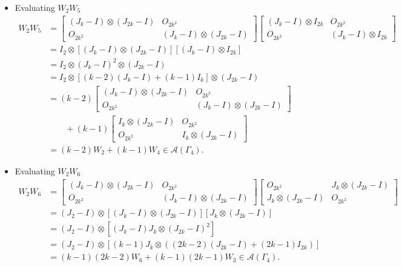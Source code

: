 \begin{itemize}
    \item Evaluating \( W_2 W_5 \)
    \begin{align*}
        W_2 W_5
        &=\begin{bmatrix}
            (J_k -I) \otimes (J_{2k} -I) & O_{2k^2}\\
            O_{2k^2} & (J_k -I) \otimes (J_{2k} -I)
        \end{bmatrix} \begin{bmatrix}
            (J_k -I) \otimes I_{2k} & O_{2k^2}\\
            O_{2k^2} & (J_k -I) \otimes I_{2k}
        \end{bmatrix}\\
        &= I_2 \otimes [(J_k -I) \otimes (J_{2k} -I)][(J_k -I) \otimes I_{2k}]\\
        &= I_2 \otimes (J_k -I)^2 \otimes (J_{2k} -I)\\
        &= I_2 \otimes [(k-2)(J_k-I) + (k-1)I_k] \otimes (J_{2k} -I) \\
        &= (k-2)\begin{bmatrix}
            (J_k -I) \otimes (J_{2k} -I) & O_{2k^2}\\
            O_{2k^2} & (J_k -I) \otimes (J_{2k} -I)
        \end{bmatrix} \\
        &\quad\quad+(k-1)\begin{bmatrix}
            I_{k} \otimes (J_{2k} - I) & O_{2k^2} \\
            O_{2k^2} & I_{k} \otimes (J_{2k} - I)
        \end{bmatrix}\\
        &= (k-2)W_2 + (k-1)W_4\in\mathcal{A}(\Gamma_4).
    \end{align*}
    
    \item Evaluating \( W_2 W_6 \)
    \begin{align*}
        W_2 W_6
        &=\begin{bmatrix}
            (J_k -I) \otimes (J_{2k} -I) & O_{2k^2}\\
            O_{2k^2} & (J_k -I) \otimes (J_{2k} -I)
        \end{bmatrix}\begin{bmatrix}
            O_{2k^2} & J_k \otimes (J_{2k}-I) \\
            J_k \otimes (J_{2k}-I) & O_{2k^2}
        \end{bmatrix}\\
        &= (J_2-I)\otimes [(J_k -I) \otimes (J_{2k} -I)][J_k \otimes (J_{2k}-I)]\\
        &= (J_2-I)\otimes [(J_k -I)J_k \otimes (J_{2k} -I)^2]\\
        &= (J_2-I)\otimes [(k-1)J_k \otimes ((2k-2)(J_{2k}-I) + (2k-1)I_{2k})]\\
        &= (k-1)(2k-2)W_6 + (k-1)(2k-1)W_3\in\mathcal{A}(\Gamma_4).
    \end{align*}


\end{itemize}
